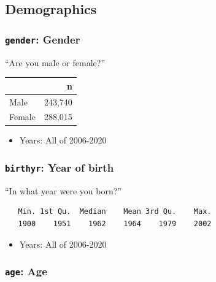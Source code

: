 \documentclass[10pt,article,oneside]{memoir}
\theoremstyle{definition}
\begin{document}
\newpage

\hypertarget{demographics}{%
\subsection{Demographics}\label{demographics}}

\hypertarget{gender-gender}{%
\subsubsection{\texorpdfstring{\texttt{gender}:
Gender}{gender: Gender}}\label{gender-gender}}

``Are you male or female?''

\begin{table}[H]
\centering
\begin{tabular}{lr}
\toprule
 & n\\
\midrule
Male & 243,740\\
Female & 288,015\\
\bottomrule
\end{tabular}
\end{table}

\begin{itemize}
\tightlist
\item
  Years: All of 2006-2020
\end{itemize}

\hypertarget{birthyr-year-of-birth}{%
\subsubsection{\texorpdfstring{\texttt{birthyr}: Year of
birth}{birthyr: Year of birth}}\label{birthyr-year-of-birth}}

``In what year were you born?''

\begin{verbatim}
   Min. 1st Qu.  Median    Mean 3rd Qu.    Max. 
   1900    1951    1962    1964    1979    2002 
\end{verbatim}

\begin{itemize}
\tightlist
\item
  Years: All of 2006-2020
\end{itemize}

\hypertarget{age-age}{%
\subsubsection{\texorpdfstring{\texttt{age}:
Age}{age: Age}}\label{age-age}}
\end{document}
